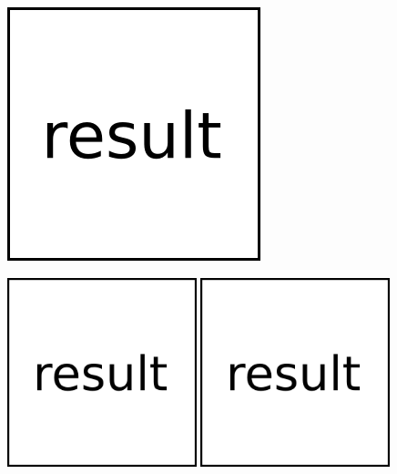 \documentclass{sciposter}
\begin{document}
\begin{multicols}{3}
\begin{figure}
	\includegraphics[width=\textwidth]{fig/result.png}
\end{figure}
%
\lipsum[1]
%
\begin{figure}
	\includegraphics[width=0.49\textwidth]{fig/result.png}
	\includegraphics[width=0.49\textwidth]{fig/result.png}
\end{figure}
%
\lipsum[1]



\end{multicols}
\end{document}
